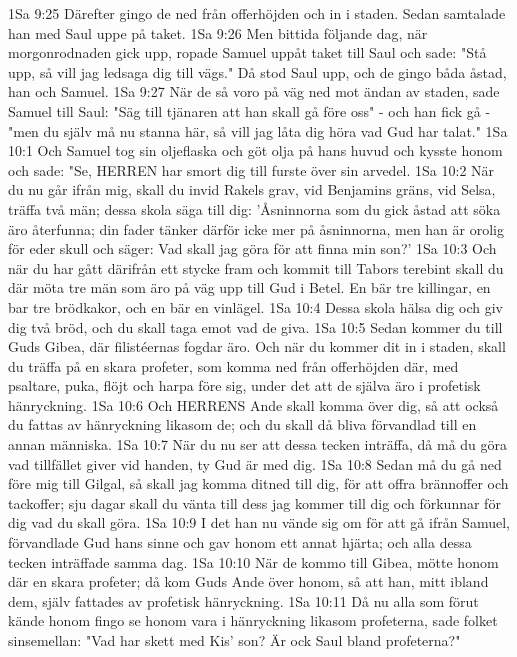 1Sa 9:25  Därefter gingo de ned från offerhöjden och in i staden. Sedan samtalade han med Saul uppe på taket.
1Sa 9:26  Men bittida följande dag, när morgonrodnaden gick upp, ropade Samuel uppåt taket till Saul och sade: "Stå upp, så vill jag ledsaga dig till vägs." Då stod Saul upp, och de gingo båda åstad, han och Samuel.
1Sa 9:27  När de så voro på väg ned mot ändan av staden, sade Samuel till Saul: "Säg till tjänaren att han skall gå före oss" - och han fick gå - "men du själv må nu stanna här, så vill jag låta dig höra vad Gud har talat."
1Sa 10:1  Och Samuel tog sin oljeflaska och göt olja på hans huvud och kysste honom och sade: "Se, HERREN har smort dig till furste över sin arvedel.
1Sa 10:2  När du nu går ifrån mig, skall du invid Rakels grav, vid Benjamins gräns, vid Selsa, träffa två män; dessa skola säga till dig: 'Åsninnorna som du gick åstad att söka äro återfunna; din fader tänker därför icke mer på åsninnorna, men han är orolig för eder skull och säger: Vad skall jag göra för att finna min son?'
1Sa 10:3  Och när du har gått därifrån ett stycke fram och kommit till Tabors terebint skall du där möta tre män som äro på väg upp till Gud i Betel. En bär tre killingar, en bar tre brödkakor, och en bär en vinlägel.
1Sa 10:4  Dessa skola hälsa dig och giv dig två bröd, och du skall taga emot vad de giva.
1Sa 10:5  Sedan kommer du till Guds Gibea, där filistéernas fogdar äro. Och när du kommer dit in i staden, skall du träffa på en skara profeter, som komma ned från offerhöjden där, med psaltare, puka, flöjt och harpa före sig, under det att de själva äro i profetisk hänryckning.
1Sa 10:6  Och HERRENS Ande skall komma över dig, så att också du fattas av hänryckning likasom de; och du skall då bliva förvandlad till en annan människa.
1Sa 10:7  När du nu ser att dessa tecken inträffa, då må du göra vad tillfället giver vid handen, ty Gud är med dig.
1Sa 10:8  Sedan må du gå ned före mig till Gilgal, så skall jag komma ditned till dig, för att offra brännoffer och tackoffer; sju dagar skall du vänta till dess jag kommer till dig och förkunnar för dig vad du skall göra.
1Sa 10:9  I det han nu vände sig om för att gå ifrån Samuel, förvandlade Gud hans sinne och gav honom ett annat hjärta; och alla dessa tecken inträffade samma dag.
1Sa 10:10  När de kommo till Gibea, mötte honom där en skara profeter; då kom Guds Ande över honom, så att han, mitt ibland dem, själv fattades av profetisk hänryckning.
1Sa 10:11  Då nu alla som förut kände honom fingo se honom vara i hänryckning likasom profeterna, sade folket sinsemellan: "Vad har skett med Kis' son? Är ock Saul bland profeterna?"
